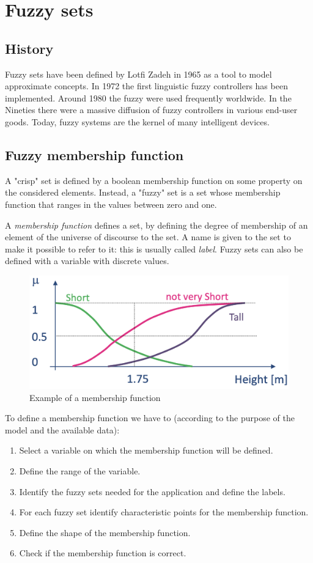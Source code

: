 \documentclass[12pt, a4paper]{report}
\newtheorem[L]{theorem}{Theorem}
\newtheorem[M]{corollary}{Corollary}
\newtheorem[M]{lemma}{Lemma}
\newtheorem[style=S,bodystyle=\normalfont]{definition}{Definition}
\begin{document}
    \newpage

    \chapter{Fuzzy sets}
    \section{History}
    Fuzzy sets have been defined by Lotfi Zadeh in 1965 as a tool to model approximate concepts. In 1972 the first linguistic fuzzy
    controllers has been implemented. Around 1980 the fuzzy were used frequently worldwide. In the Nineties there were a massive 
    diffusion of fuzzy controllers in various end-user goods. Today, fuzzy systems are the kernel of many intelligent devices. 

    \section{Fuzzy membership function}
    A "crisp" set is defined by a boolean membership function on some property on the considered elements. Instead, a "fuzzy" set is
    a set whose membership function that ranges in the values between zero and one.
    \begin{definition}
        A \emph{membership function} defines a set, by defining the degree of membership of an element of the universe of discourse 
        to the set. A name is given to the set to make it possible to refer to it: this is usually called \emph{label}. Fuzzy sets can 
        also be defined with a variable with discrete values. 
    \end{definition}
    \begin{figure}[H]
        \centering
        \includegraphics[width=0.50\linewidth]{images/function.png}
        \caption{Example of a membership function}
    \end{figure}
    To define a membership function we have to (according to the purpose of the model and the available data):
    \begin{enumerate}
        \item Select a variable on which the membership function will be defined. 
        \item Define the range of the variable.
        \item Identify the fuzzy sets needed for the application and define the labels. 
        \item For each fuzzy set identify characteristic points for the membership function.
        \item Define the shape of the membership function.
        \item Check if the membership function is correct.
    \end{enumerate}
\end{document}

